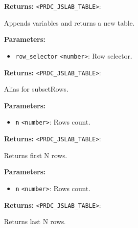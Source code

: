 \documentclass[12pt,a4paper]{article}
\begin{document}
\noindent \textbf{Returns:} \texttt{<PRDC\_JSLAB\_TABLE>}:

\noindent Appends variables and returns a new table.

\vspace{5mm}
\noindent {}


\noindent \textbf{Parameters:}
\begin{itemize}
  \item \texttt{row\_selector} \texttt{<number>}: Row selector.
\end{itemize}

\noindent \textbf{Returns:} \texttt{<PRDC\_JSLAB\_TABLE>}:

\noindent Alias for subsetRows.

\vspace{5mm}
\noindent {}


\noindent \textbf{Parameters:}
\begin{itemize}
  \item \texttt{n} \texttt{<number>}: Rows count.
\end{itemize}

\noindent \textbf{Returns:} \texttt{<PRDC\_JSLAB\_TABLE>}:

\noindent Returns first N rows.

\vspace{5mm}
\noindent {}


\noindent \textbf{Parameters:}
\begin{itemize}
  \item \texttt{n} \texttt{<number>}: Rows count.
\end{itemize}

\noindent \textbf{Returns:} \texttt{<PRDC\_JSLAB\_TABLE>}:

\noindent Returns last N rows.

\vspace{5mm}
\noindent {}
\end{document}
